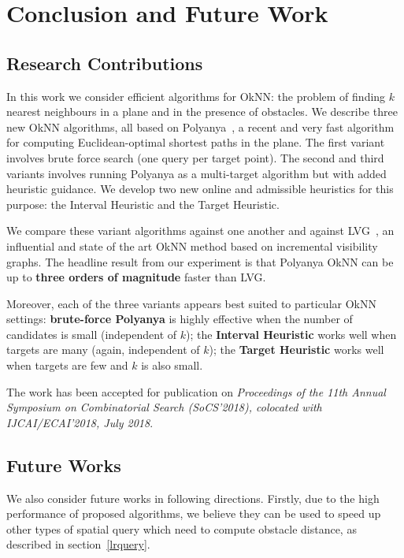 \chapter{Conclusion and Future Work}\label{conclusionfuture}
\section{Research Contributions}\label{contribution}

In this work we consider efficient algorithms for OkNN:
the problem of finding $k$ nearest neighbours in a plane and in the presence of obstacles.
We describe three new OkNN algorithms, all based on Polyanya~\cite{cuicompromise},
a recent and very fast algorithm for computing Euclidean-optimal shortest paths in the plane.
The first variant involves brute force search (one query per target point).
The second and third variants involves running Polyanya as a multi-target algorithm but with added heuristic guidance.
We develop two new online and admissible heuristics for this purpose: the Interval Heuristic and the Target Heuristic.

We compare these variant algorithms against one another and against LVG~\cite{zhang2004spatial},
an influential and state of the art OkNN method based on incremental visibility graphs.
The headline result from our experiment is that Polyanya OkNN can be up to
\textbf{three orders of magnitude} faster than LVG.

Moreover, each of the three variants appears best suited to particular OkNN settings:
\textbf{brute-force Polyanya} is highly effective when the number of candidates is small (independent of $k$);
the \textbf{Interval Heuristic} works well when targets are many (again, independent of $k$);
the \textbf{Target Heuristic} works well when targets are few and $k$ is also small.

The work has been accepted for publication on \textit{Proceedings of the 11th Annual Symposium on Combinatorial Search (SoCS’2018), colocated with
IJCAI/ECAI’2018, July 2018}.

\section{Future Works}\label{future}
We also consider future works in following directions.
Firstly, due to the high performance of proposed algorithms, we believe they can be used to
speed up other types of spatial query which need to compute obstacle distance,
as described in section~\ref{lrquery}.


